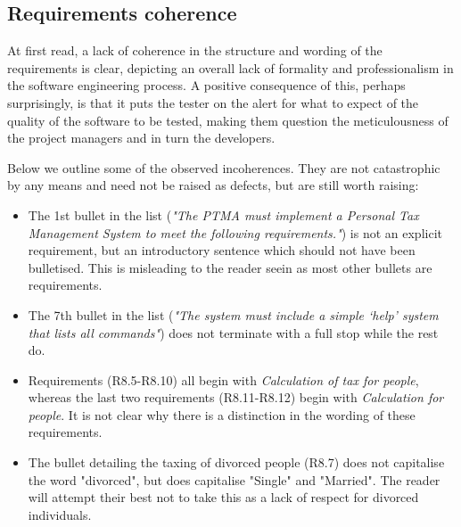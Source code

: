 \subsection{Requirements coherence}
At first read, a lack of coherence in the structure and wording of the requirements is clear, depicting an overall lack of formality and professionalism in the software engineering process. 
A positive consequence of this, perhaps surprisingly, is that it puts the tester on the alert for what to expect of the quality of the software to be tested, making them question the meticulousness of the project managers and in turn the developers.
\par
Below we outline some of the observed incoherences. They are not catastrophic by any means and need not be raised as defects, but are still worth raising:
\begin{itemize}
	\item The 1st bullet in the list (\textit{"The PTMA must implement a Personal Tax Management System to meet the following requirements."}) is not an explicit requirement, but an introductory sentence which should not have been bulletised. This is misleading to the reader seein as most other bullets are requirements. 
	\item The 7th bullet in the list (\textit{"The system must include a simple ‘help’ system that lists all commands"}) does not terminate with a full stop while the rest do. 
	\item Requirements (R8.5-R8.10) all begin with \textit{Calculation of tax for people}, whereas the last two requirements (R8.11-R8.12) begin with \textit{Calculation for people}. It is not clear why there is a distinction in the wording of these requirements. 
	\item The bullet detailing the taxing of divorced people (R8.7) does not capitalise the word "divorced", but does capitalise "Single" and "Married". The reader will attempt their best not to take this as a lack of respect for divorced individuals. 
\end{itemize}

